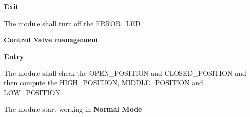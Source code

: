\begin{req_enum}
\begin{req_enum}[label*=\arabic*.]
\begin{req_enum}[label*=\arabic*.]
							\item \textbf{Exit}
								\begin{req_enum}[label*=\arabic*.]
									\item The module shall turn off the ERROR\_LED
								\end{req_enum}
						\end{req_enum}
				\end{req_enum}
			\item \textbf{Control Valve management}
				\begin{req_enum}[label*=\arabic*.]
					\item \textbf{Entry}
					\begin{req_enum}[label*=\arabic*.]
						\item The module shall check the OPEN\_POSITION and CLOSED\_POSITION and then compute the HIGH\_POSITION, MIDDLE\_POSITION and LOW\_POSITION
						\item The module start working in \textbf{Normal Mode}
					\end{req_enum}


\end{req_enum}
\end{req_enum}
